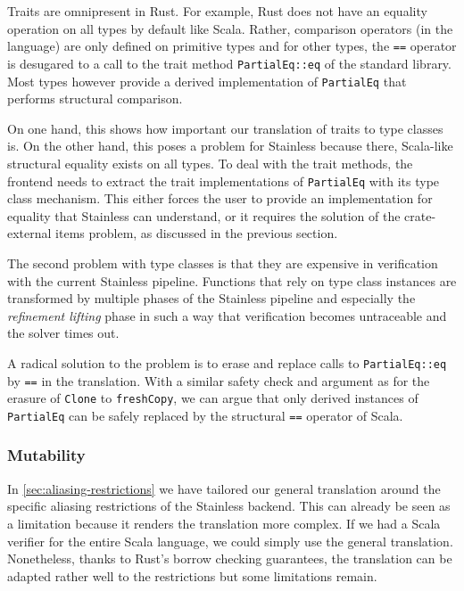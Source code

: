 Traits are omnipresent in Rust. For example, Rust does not have an
equality operation on all types by default like Scala. Rather,
comparison operators (in the language) are only defined on primitive
types and for other types, the \passthrough{\lstinline!==!} operator is
desugared to a call to the trait method
\passthrough{\lstinline!PartialEq::eq!} of the standard library. Most
types however provide a derived implementation of
\passthrough{\lstinline!PartialEq!} that performs structural comparison.

On one hand, this shows how important our translation of traits to type
classes is. On the other hand, this poses a problem for Stainless
because there, Scala-like structural equality exists on all types. To
deal with the trait methods, the frontend needs to extract the trait
implementations of \passthrough{\lstinline!PartialEq!} with its type
class mechanism. This either forces the user to provide an
implementation for equality that Stainless can understand, or it
requires the solution of the crate-external items problem, as discussed
in the previous section.

The second problem with type classes is that they are expensive in
verification with the current Stainless pipeline. Functions that rely on
type class instances are transformed by multiple phases of the Stainless
pipeline and especially the \emph{refinement lifting} phase in such a
way that verification becomes untraceable and the solver times out.

A radical solution to the problem is to erase and replace calls to
\passthrough{\lstinline!PartialEq::eq!} by \passthrough{\lstinline!==!}
in the translation. With a similar safety check and argument as for the
erasure of \passthrough{\lstinline!Clone!} to
\passthrough{\lstinline!freshCopy!}, we can argue that only derived
instances of \passthrough{\lstinline!PartialEq!} can be safely replaced
by the structural \passthrough{\lstinline!==!} operator of Scala.

\subsubsection{Mutability}

In \autoref{sec:aliasing-restrictions} we have tailored our general
translation around the specific aliasing restrictions of the Stainless
backend. This can already be seen as a limitation because it renders the
translation more complex. If we had a Scala verifier for the entire
Scala language, we could simply use the general translation.
Nonetheless, thanks to Rust's borrow checking guarantees, the
translation can be adapted rather well to the restrictions but some
limitations remain.


